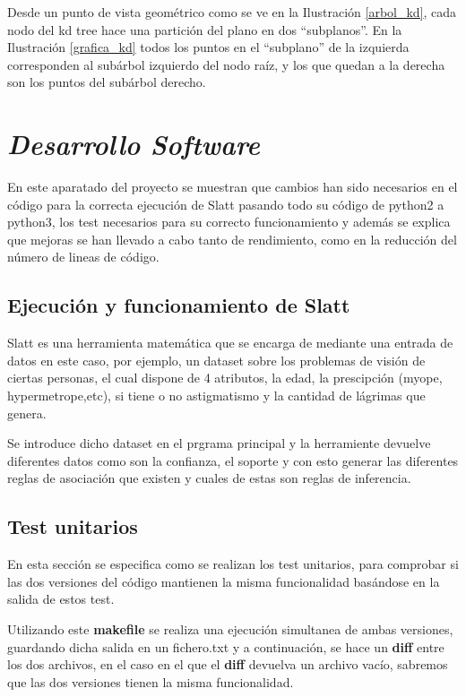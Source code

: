 \documentclass{cosas/tfg_domingo}
\begin{document}
Desde un punto de vista geométrico como se ve en la Ilustración \ref{arbol_kd}, cada nodo del kd tree hace una partición del plano en dos “subplanos”. En la Ilustración \ref{grafica_kd} todos los puntos en el “subplano” de la izquierda corresponden al subárbol izquierdo del nodo raíz, y los que quedan a la derecha son los puntos del subárbol derecho.


\chapter{\emph{Desarrollo Software}}
En este aparatado del proyecto se muestran que cambios han sido necesarios en el código para la correcta ejecución de Slatt pasando todo su código de python2 a python3, los test necesarios para su correcto funcionamiento y además se explica que mejoras se han llevado a cabo tanto de rendimiento, como en la reducción del número de lineas de código.

\section{Ejecución y funcionamiento de Slatt}

Slatt es una herramienta matemática que se encarga de mediante una entrada de datos en este caso, por ejemplo, un dataset sobre los problemas de visión de ciertas personas, el cual dispone de 4 atributos, la edad, la prescipción (myope, hypermetrope,etc), si tiene o no astigmatismo y la cantidad de lágrimas que genera.

Se introduce dicho dataset en el prgrama principal y la herramiente devuelve diferentes datos como son la confianza, el soporte y con esto generar las diferentes reglas de asociación que existen y cuales de estas son reglas de inferencia. 

\section{Test unitarios}

En esta sección se especifica como se realizan los test unitarios, para comprobar si las dos versiones del código mantienen la misma funcionalidad basándose en la salida de estos test.

\hfill



Utilizando este \textbf{makefile} se realiza una ejecución simultanea de ambas versiones, guardando dicha salida en un fichero.txt y a continuación, se hace un \textbf{diff} entre los dos archivos, en el caso en el que el \textbf{diff} devuelva un archivo vacío, sabremos que las dos versiones tienen la misma funcionalidad.
\end{document}
